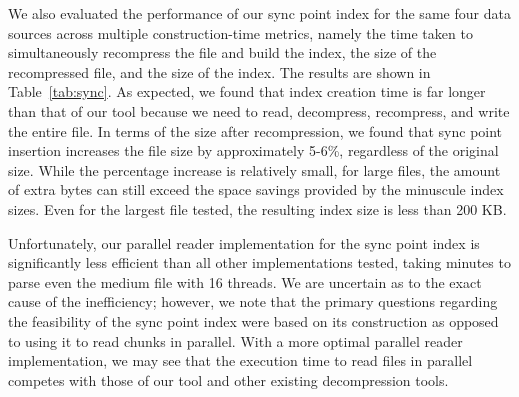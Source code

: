 We also evaluated the performance of our sync point index for the same four data 
sources across multiple construction-time metrics, namely the time taken to simultaneously 
recompress the file and build the index, the size of the recompressed file, and the size of 
the index. The results are shown in Table~\ref{tab:sync}. As expected, we found that index 
creation time is far longer than that of our \ibuilder tool because we need to read, decompress, 
recompress, and write the entire file. In terms of the \gzip size after recompression, we found 
that sync point insertion increases the file size by approximately 5-6\%, regardless of the 
original \gzip size. While the percentage increase is relatively small, for large \gzip files, 
the amount of extra bytes can still exceed the space savings provided by the minuscule index 
sizes. Even for the largest file tested, the resulting index size is less than 200 KB.

Unfortunately, our parallel reader implementation for the sync point index is significantly less 
efficient than all other implementations tested, taking minutes to parse even the medium file with 
16 threads. We are uncertain as to the exact cause of the inefficiency; however, we note that the primary 
questions regarding the feasibility of the sync point index were based on its construction as opposed 
to using it to read chunks in parallel. With a more optimal parallel reader implementation, we may 
see that the execution time to read \gzip files in parallel competes with those of our \ibuilder tool
and other existing decompression tools.
